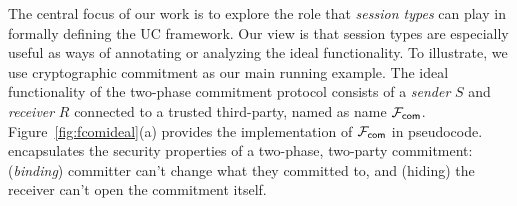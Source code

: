 
The central focus of our work is to explore the role that \emph{session types} can play in formally defining the UC framework.
Our view is that session types are especially useful as ways of annotating or analyzing the ideal functionality.
To illustrate, we use cryptographic commitment as our main running example.
The ideal functionality of the two-phase commitment protocol consists of a \emph{sender} $S$
and \emph{receiver} $R$ connected to a trusted third-party, named as
name $\mathcal{F}_{{\mathsf {com}}}$.
Figure~\ref{fig:fcomideal}(a) provides the implementation of $\mathcal{F}_{{\mathsf {com}}}$ in pseudocode.
\Fcom encapsulates the security properties of a two-phase, two-party commitment: (\emph{binding}) committer can't change what they committed to, and (hiding) the receiver can't open the commitment itself. 

